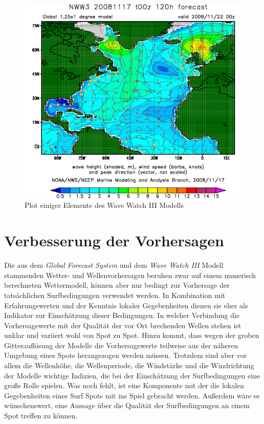\begin{figure}[h]
  \begin{center}
    \includegraphics[width=\textwidth]{bilder/wave-watch}
    \caption{Plot einiger Elemente des Wave Watch III Modells}
    \label{wave-watch-grads}
  \end{center}
\end{figure}

\section{Verbesserung der Vorhersagen}
Die aus dem \textit{Global Forecast System} und dem \textit{Wave Watch
  III} Modell stammenden Wetter- und Wellenvorhersagen beruhen zwar
auf einem numerisch berechneten Wettermodell, können aber nur bedingt
zur Vorhersage der tatsächlichen Surfbedingungen verwendet werden. In
Kombination mit Erfahrungswerten und der Kenntnis lokaler
Gegebenheiten dienen sie eher als Indikator zur Einschätzung dieser
Bedingungen. In welcher Verbindung die Vorhersagewerte mit der
Qualität der vor Ort brechenden Wellen stehen ist unklar und variiert
wohl von Spot zu Spot. Hinzu kommt, dass wegen der groben
Gitterauflösung der Modelle die Vorhersagewerte teilweise aus der
näheren Umgebung eines Spots herangezogen werden müssen. Trotzdem sind
aber vor allem die Wellenhöhe, die Wellenperiode, die Windstärke und
die Windrichtung der Modelle wichtige Indizien, die bei der
Einschätzung der Surfbedingungen eine große Rolle spielen. Was noch
fehlt, ist eine Komponente mit der die lokalen Gegebenheiten eines
Surf Spots mit ins Spiel gebracht werden. Außerdem wäre es
wünschenswert, eine Aussage über die Qualität der Surfbedingungen an
einem Spot treffen zu können.

